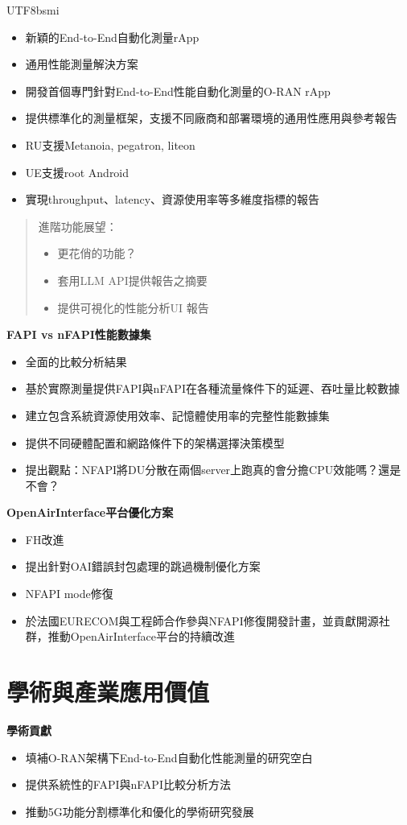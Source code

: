 \documentclass[conference]{IEEEtran}
\begin{document}
\begin{CJK}{UTF8}{bsmi}
{\begin{itemize}
    \item 新穎的End-to-End自動化測量rApp
    \item 通用性能測量解決方案
    \item 開發首個專門針對End-to-End性能自動化測量的O-RAN rApp
    \item 提供標準化的測量框架，支援不同廠商和部署環境的通用性應用與參考報告
    \item RU支援Metanoia, pegatron, liteon
    \item UE支援root Android
    \item 實現throughput、latency、資源使用率等多維度指標的報告
\end{itemize}

\begin{quote}
進階功能展望：
\begin{itemize}
    \item 更花俏的功能？
    \item 套用LLM API提供報告之摘要
    \item 提供可視化的性能分析UI 報告
\end{itemize}
\end{quote}


\textbf{FAPI vs nFAPI性能數據集}
\begin{itemize}
    \item 全面的比較分析結果
    \item 基於實際測量提供FAPI與nFAPI在各種流量條件下的延遲、吞吐量比較數據
    \item 建立包含系統資源使用效率、記憶體使用率的完整性能數據集
    \item 提供不同硬體配置和網路條件下的架構選擇決策模型
    \item 提出觀點：NFAPI將DU分散在兩個server上跑真的會分擔CPU效能嗎？還是不會？
\end{itemize}

\textbf{OpenAirInterface平台優化方案}
\begin{itemize}
    \item FH改進
    \item 提出針對OAI錯誤封包處理的跳過機制優化方案
    \item NFAPI mode修復
    \item 於法國EURECOM與工程師合作參與NFAPI修復開發計畫，並貢獻開源社群，推動OpenAirInterface平台的持續改進
\end{itemize}

\section{學術與產業應用價值}
\textbf{學術貢獻}
\begin{itemize}
    \item 填補O-RAN架構下End-to-End自動化性能測量的研究空白
    \item 提供系統性的FAPI與nFAPI比較分析方法
    \item 推動5G功能分割標準化和優化的學術研究發展
\end{itemize}

}
\end{CJK}
\end{document}
